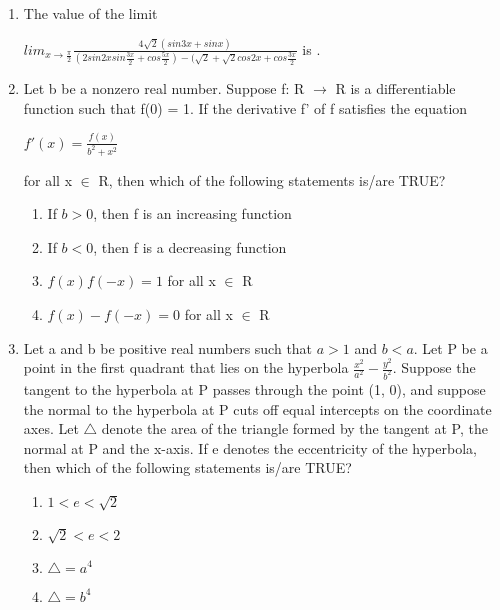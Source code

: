 \documentclass{article}
\begin{document}
\begin{enumerate}
\item The value of the limit
         
	 $lim_{x \to \frac{\pi}{2}}\frac{4\sqrt{2}(sin3x + sinx)}{(2 sin2xsin\frac{3x}{2} + cos\frac{5x}{2}) - (\sqrt{2}+\sqrt{2}cos2x + cos\frac{3x}{2}}$ is \underline{\hspace{1cm}}.

\item Let b be a nonzero real number. Suppose f: R $\to$ R is a differentiable function such that f(0) = 1.
If the derivative f' of f satisfies the equation
               
	       $f'(x) = \frac{f(x)}{b^2 + x^2}$
	       
for all x $\in$ R, then which of the following statements is/are TRUE?

\begin{enumerate}[label=\Alph*]
\item If $b > 0$, then f is an increasing function\\
\item If $b < 0$, then f is a decreasing function \\
\item $f(x)f(-x) = 1$ for all x $\in$ R\\
\item $f(x) - f(-x) = 0$ for all x $\in$ R
\end{enumerate}

\item Let a and b be positive real numbers such that $a > 1$ and $b < a$. Let P be a point in the first quadrant that lies on the hyperbola $\frac{x^2}{a^2} - \frac{y^2}{b^2}$. Suppose the tangent to the hyperbola at P passes through the point (1, 0), and suppose the normal to the hyperbola at P cuts off equal intercepts on the coordinate axes. Let $\triangle$ denote the area of the triangle formed by the tangent at P, the normal at P and the x-axis. If e denotes the eccentricity of the hyperbola, then which of the following statements is/are TRUE?
			
\begin{enumerate}[label=\Alph*]	
\item $1< e <\sqrt{2}$\\
\item $\sqrt{2}< e <2$\\
\item $\triangle = a^4$\\
\item $\triangle = b^4$
\end{enumerate}	


\end{enumerate}
\end{document}
